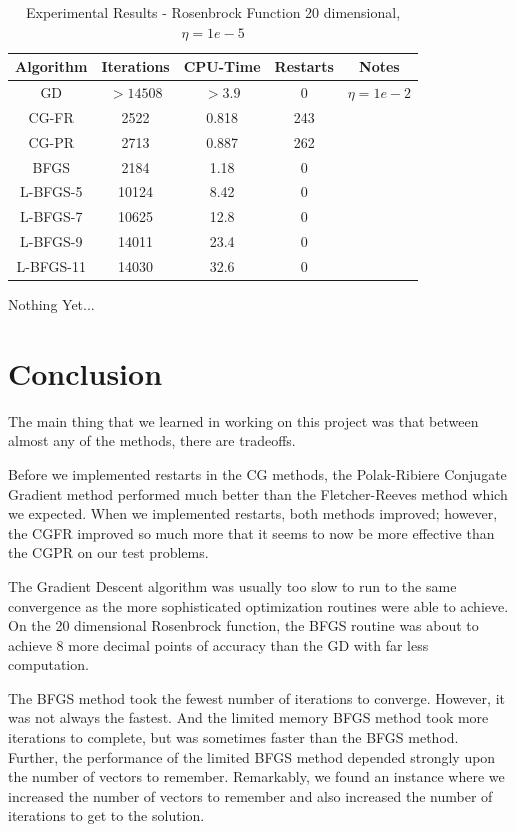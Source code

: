 \documentclass[12pt]{amsart}
\begin{document}
\begin{table}
\caption{Experimental Results - Rosenbrock Function 20 dimensional, $\eta=1e-5$}
\label{results_table}
\begin{center}
\begin{tabular}{|c||c||c||c||c|}
\hline
Algorithm & Iterations & CPU-Time & Restarts & Notes\\
\hline
GD & $>14508$ & $>3.9$ & 0 & $\eta=1e-2$\\
\hline
CG-FR & 2522 & 0.818 & 243 & \\
\hline
CG-PR & 2713 & 0.887 & 262 & \\
\hline
BFGS & 2184 & 1.18 & 0 & \\
\hline
L-BFGS-5 & 10124 & 8.42 & 0 &\\
\hline
L-BFGS-7 & 10625 & 12.8 & 0 &\\
\hline
L-BFGS-9 & 14011 & 23.4 & 0 &\\
\hline
L-BFGS-11 & 14030 & 32.6 & 0 &\\
\hline
\end{tabular}
\end{center}
\end{table}



Nothing Yet...


\section{Conclusion}
The main thing that we learned in working on this project was that between almost any of the methods, there are tradeoffs.  

Before we implemented restarts in the CG methods, the Polak-Ribiere Conjugate Gradient method performed much better than the Fletcher-Reeves method which we expected.  When we implemented restarts, both methods improved; however, the CGFR improved so much more that it seems to now be more effective than the CGPR on our test problems.  

The Gradient Descent algorithm was usually too slow to run to the same convergence as the more sophisticated optimization routines were able to achieve.  On the 20 dimensional Rosenbrock function, the BFGS routine was about to achieve 8 more decimal points of accuracy than the GD with far less computation.  

The BFGS method took the fewest number of iterations to converge.  However, it was not always the fastest.  And the limited memory BFGS method took more iterations to complete, but was sometimes faster than the BFGS method.  Further, the performance of the limited BFGS method depended strongly upon the number of vectors to remember.  Remarkably, we found an instance where we increased the number of vectors to remember and also increased the number of iterations to get to the solution.
\end{document}

